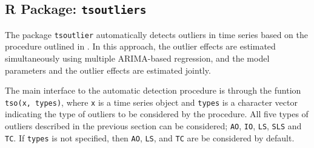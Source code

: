 \subsection{R Package: \texttt{tsoutliers}} The package \verb|tsoutlier| automatically detects outliers in time series based on the procedure outlined in \cite{chenliu}. In this approach, the outlier effects are estimated simultaneously using multiple ARIMA-based regression, and the model parameters and the outlier effects are estimated jointly. \par The main interface to the automatic detection procedure is through the funtion \verb|tso(x, types)|, where \verb|x| is a time series object and \verb|types| is a character vector indicating the type of outliers to be considered by the procedure. All five types of outliers described in the previous section can be considered; \verb|AO|, \verb|IO|, \verb|LS|, \verb|SLS| and \verb|TC|. If \verb|types| is not specified, then \verb|AO|, \verb|LS|, and \verb|TC| are be considered by default. 
